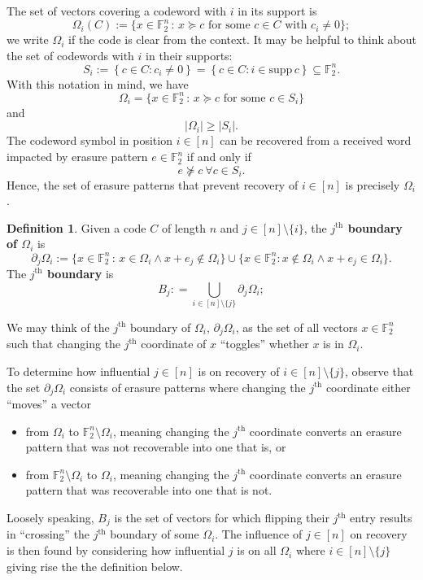 \documentclass[12pt]{article}
\newcommand{\F}{\mathbb{F}}
\def\F{\mathbb F}
\def\supp{\mathrm{supp}\,}
\newcommand{\FF}{\mathbb{F}}
\theoremstyle{definition}
\newtheorem{definition}[theorem]{Definition}
\begin{document}
The set of vectors covering a codeword with $i$ in its support is
\[
\Omega_i(C) := \{ {x} \in \FF_2^n \,\colon\, {x} \succeq {c} \mbox{ for some } c \in C \mbox{ with } c_i \neq 0 \};
\]
we write $\Omega_i$ if the code is clear from the context. It may be helpful to think about the set of codewords with $i$ in their supports:
$$S_i:= \left\{ c \in C \colon c_i \neq 0 \right\} = \left\{ c \in C \colon i \in \supp c \right\} \subseteq \F_2^n.$$
With this notation in mind, we have
\[
\Omega_i = \{ {x} \in \FF_2^n \,:\, {x} \succeq {c} \mbox{ for some } c \in S_i  \}
\] 
and $$| \Omega_i | \geq | S_i |.$$ 
The codeword symbol in position $i \in [n]$ can be recovered from a received word impacted by erasure pattern $e \in \F_2^n$ if and only if $$e \nsucceq c \ \forall c \in S_{i}.$$ Hence, 
the set of erasure patterns that prevent recovery of $i \in [n]$ is precisely $\Omega_i$.

\begin{definition} Given a code $C$ of length $n$ and $j \in [n] \setminus \{ i \}$, the {\bf \(j^\text{th}\) boundary of \(\Omega_i\)} is
\[
\partial_j \Omega_i := \{{x} \in \FF_2^n \,:\, {x} \in \Omega_i \wedge {x} + {e}_j \not\in \Omega_i \} \cup \{ x \in \F_2^n\colon  {x} \not\in \Omega_i \wedge {x} + {e}_j \in \Omega_i\}.
\]
The {\bf \(j^\text{th}\) boundary} is 
\[
B_j: = \bigcup_{i \in [n] \setminus \{  j \} } \partial_j\Omega_i;
\]
\end{definition}


We may think of the \(j^\text{th}\) boundary of \(\Omega_i\),  \(\partial_j\Omega_i\), as the set of all vectors \({x} \in \F_2^n\) such that changing the \(j^\text{th}\) coordinate of \({x}\) ``toggles'' whether \({x}\) is in \(\Omega_i\). 

To determine how influential $j \in [n]$ is on recovery of $i \in [n] \setminus \{ j \}$, observe that the set $\partial_j\Omega_i$ consists of erasure patterns where changing the $j^\text{th}$ coordinate either ``moves'' a vector
\begin{itemize}
\item 
 from $\Omega_i$ to $\F_2^n\setminus \Omega_i$, meaning changing the $j^\text{th}$ coordinate converts an erasure pattern that was not recoverable into one that is, or
\item  from $\F_2^n\setminus \Omega_i$
to $\Omega_i$, meaning changing the $j^\text{th}$ coordinate converts an erasure pattern that was recoverable into one that is not.
\end{itemize}
Loosely speaking, \(B_j\) is the set of  vectors for which flipping their \(j^\text{th}\) entry results in ``crossing'' the \(j^\text{th}\) boundary of some \(\Omega_i\). 
The influence of $j \in [n]$ on recovery is then found by considering how influential $j$ is on all $\Omega_i$ where $i \in [n] \setminus \{j\}$ giving rise the the definition below. 
\end{document}
